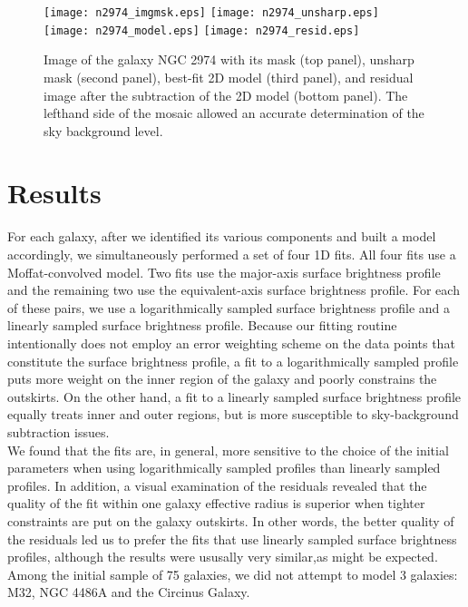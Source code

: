 \documentclass[preprint2]{emulateapj}
\begin{document}
\begin{figure}[h]
\begin{center}
\texttt{[image: n2974\_imgmsk.eps]}
\texttt{[image: n2974\_unsharp.eps]}
\texttt{[image: n2974\_model.eps]}
\texttt{[image: n2974\_resid.eps]}
\caption{Image of the galaxy NGC 2974 with its mask (top panel), unsharp mask (second panel), 
best-fit 2D model (third panel), 
and residual image after the subtraction of the 2D model (bottom panel).
The lefthand side of the mosaic allowed an accurate determination of the sky background level.}
\label{fig:n29742d}
\end{center}
\end{figure}


\section{Results}
\label{sec:res}
For each galaxy, after we identified its various components and built a model accordingly, 
we simultaneously performed a set of four 1D fits.
All four fits use a Moffat-convolved model.
Two fits use the major-axis surface brightness profile and the remaining two use the equivalent-axis surface brightness profile. 
For each of these pairs, we use a logarithmically sampled surface brightness profile 
and a linearly sampled surface brightness profile. 
Because our fitting routine intentionally does not employ an error weighting scheme on the data points that constitute the surface brightness profile, 
a fit to a logarithmically sampled profile puts more weight on the inner region of the galaxy 
and poorly constrains the outskirts.
On the other hand, a fit to a linearly sampled surface brightness profile equally treats inner and outer regions, 
but is more susceptible to sky-background subtraction issues. \\ 
We found that the fits are, in general, more sensitive to the choice of the initial parameters 
when using logarithmically sampled profiles than linearly sampled profiles. 
In addition, a visual examination of the residuals revealed that the quality of the fit within one galaxy effective radius 
is superior when tighter constraints are put on the galaxy outskirts.
In other words, the better quality of the residuals led us to prefer the fits that use linearly sampled surface brightness profiles,
although the results were ususally very similar,as might be expected. \\
Among the initial sample of 75 galaxies, we did not attempt to model 3 galaxies: M32, NGC 4486A and the Circinus Galaxy. 
\end{document}
